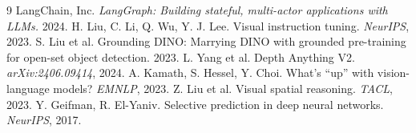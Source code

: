 \documentclass[10pt,twocolumn,letterpaper]{article}
\begin{document}
\begin{thebibliography}{9}
\small
{} LangChain, Inc. \emph{LangGraph: Building stateful,
multi-actor applications with LLMs.} 2024.
 H. Liu, C. Li, Q. Wu, Y. J. Lee. Visual instruction tuning.
\emph{NeurIPS}, 2023.
 S. Liu et al. Grounding DINO: Marrying DINO with grounded
pre-training for open-set object detection. 2023.
 L. Yang et al. Depth Anything V2.
\emph{arXiv:2406.09414}, 2024.
 A. Kamath, S. Hessel, Y. Choi. What's ``up'' with
vision-language models? \emph{EMNLP}, 2023.
 Z. Liu et al. Visual spatial reasoning. \emph{TACL}, 2023.
 Y. Geifman, R. El-Yaniv. Selective prediction in deep
neural networks. \emph{NeurIPS}, 2017.
\end{thebibliography}
\end{document}
